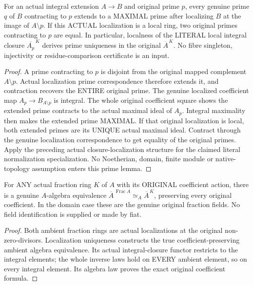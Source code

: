 \begin{theorem}
\label{algebra:actual-local-normalization-prime-uniqueness}
For an actual integral extension $A\to B$ and original prime
$p$, every genuine prime $q$ of $B$ contracting to $p$ extends
to a MAXIMAL prime after localizing $B$ at the image of
$A\setminus p$. If this ACTUAL localization is a local ring,
two original primes contracting to $p$ are equal.
In particular, localness of the LITERAL local integral closure
$\overline{A_p}^{\,K}$ derives prime uniqueness in the original
$\overline A^{\,K}$. No fibre singleton, injectivity or
residue-comparison certificate is an input.
\leanok
\end{theorem}
\begin{proof}
A prime contracting to $p$ is disjoint from the original mapped
complement $A\setminus p$. Actual localization prime
correspondence therefore extends it, and contraction recovers
the ENTIRE original prime. The genuine localized coefficient
map $A_p\to B_{A\setminus p}$ is integral. The whole original
coefficient square shows the extended prime contracts to the
actual maximal ideal of $A_p$. Integral maximality then makes
the extended prime MAXIMAL. If that original localization is
local, both extended primes are its UNIQUE actual maximal ideal.
Contract through the genuine localization correspondence to get
equality of the original primes. Apply the preceding actual
closure-localization structure for the claimed literal
normalization specialization. No Noetherian, domain, finite
module or native-topology assumption enters this prime lemma.
\end{proof}

\begin{theorem}
\label{algebra:actual-normalization-fraction-field-choice}
For ANY actual fraction ring $K$ of $A$ with its ORIGINAL
coefficient action, there is a genuine $A$-algebra equivalence
$\overline A^{\,\operatorname{Frac}A}\simeq_A\overline A^{\,K}$,
preserving every original coefficient. In the domain case these
are the genuine original fraction fields. No field identification
is supplied or made by fiat.
\leanok
\end{theorem}
\begin{proof}
Both ambient fraction rings are actual localizations at the
original non-zero-divisors. Localization uniqueness constructs
the true coefficient-preserving ambient algebra equivalence.
Its actual integral-closure functor restricts to the integral
elements; the whole inverse laws hold on EVERY ambient element,
so on every integral element. Its algebra law proves the exact
original coefficient formula.
\end{proof}

